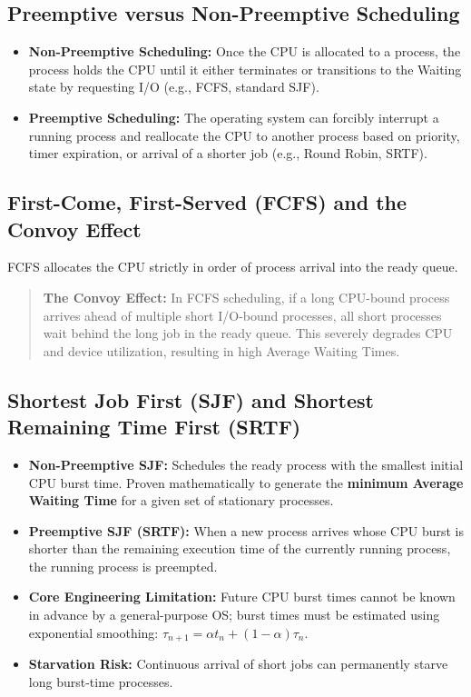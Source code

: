 \subsection{Preemptive versus Non-Preemptive Scheduling}
\begin{itemize}
    \item \textbf{Non-Preemptive Scheduling:} Once the CPU is allocated to a process, the process holds the CPU until it either terminates or transitions to the Waiting state by requesting I/O (e.g., FCFS, standard SJF).
    \item \textbf{Preemptive Scheduling:} The operating system can forcibly interrupt a running process and reallocate the CPU to another process based on priority, timer expiration, or arrival of a shorter job (e.g., Round Robin, SRTF).
\end{itemize}

\subsection{First-Come, First-Served (FCFS) and the Convoy Effect}
FCFS allocates the CPU strictly in order of process arrival into the ready queue.
\begin{quote}
\textbf{The Convoy Effect:} In FCFS scheduling, if a long CPU-bound process arrives ahead of multiple short I/O-bound processes, all short processes wait behind the long job in the ready queue. This severely degrades CPU and device utilization, resulting in high Average Waiting Times.
\end{quote}

\subsection{Shortest Job First (SJF) and Shortest Remaining Time First (SRTF)}
\begin{itemize}
    \item \textbf{Non-Preemptive SJF:} Schedules the ready process with the smallest initial CPU burst time. Proven mathematically to generate the \textbf{minimum Average Waiting Time} for a given set of stationary processes.
    \item \textbf{Preemptive SJF (SRTF):} When a new process arrives whose CPU burst is shorter than the remaining execution time of the currently running process, the running process is preempted.
    \item \textbf{Core Engineering Limitation:} Future CPU burst times cannot be known in advance by a general-purpose OS; burst times must be estimated using exponential smoothing: $\tau_{n+1} = \alpha t_n + (1 - \alpha) \tau_n$.
    \item \textbf{Starvation Risk:} Continuous arrival of short jobs can permanently starve long burst-time processes.
\end{itemize}

